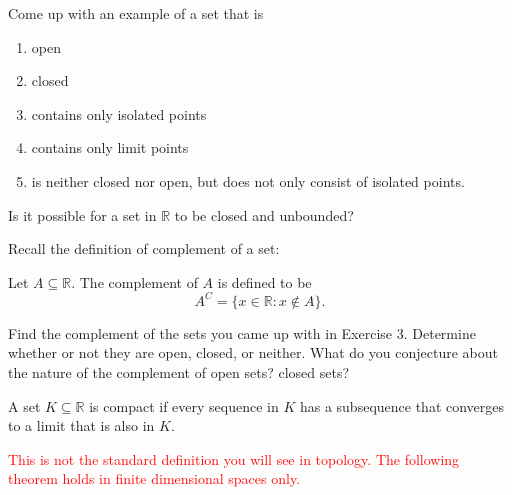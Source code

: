 \documentclass{ximera}
\begin{document}
\begin{exercise}
    Come up with an example of a set that is 
    \begin{enumerate}
        \item open
        \item closed
        \item contains only isolated points
        \item contains only limit points
        \item is neither closed nor open, but does not only consist of isolated points.
    \end{enumerate}
\end{exercise}

    \begin{exercise}
        Is it possible for a set in $\mathbb{R}$ to be closed and unbounded?
    \end{exercise}

    Recall the definition of complement of a set:
    \begin{definition}
        Let $A \subseteq \mathbb{R}$.  The complement of $A$ is defined to be 
        \[A^C = \{x \in \mathbb{R}: x \notin A\}.\]
    \end{definition}

    \begin{exercise}
        Find the complement of the sets you came up with in Exercise 3.  Determine whether or not they are open, closed, or neither.   What do you conjecture about the nature of the complement of open sets? closed sets?
    \end{exercise}

\begin{definition}
    A set $K \subseteq \mathbb{R}$ is compact if every sequence in $K$ has a subsequence that converges to a limit that is also in $K$. 
\end{definition}

\textcolor{red}{This is not the standard definition you will see in topology.  The following theorem holds in finite dimensional spaces only.}
\end{document}
